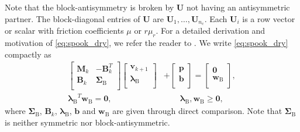 \documentclass[preprint,12pt]{elsarticle}
\let\vec\bm
\let\mat\mathbf
\numberwithin{equation}{section}
\def\jacb{\mat{B}}
\def\tB{\text{B}}
\def\tc{\text{c}}
\newcommand{\complementarityalign}[2]{{#1}^T{#2}=\vec{0}, &\qquad #1, #2 \geq \vec{0}}
\begin{document}
Note that the block-antisymmetry is broken by $\mat{U}$ not having an antisymmetric partner. The block-diagonal entries of $\mat{U}$ are $\mat{U}_1, \hdots, \mat{U}_{n_\tc}$. Each $\mat{U}_i$ is a row vector or scalar with friction coefficients $\mu$ or $r \mu_r$.
For a detailed derivation and motivation of \eqref{eq:spook_dry}, we refer the reader to \cite{lacoursiere2007ghosts}.
We write \eqref{eq:spook_dry} compactly as
\begin{equation}
    \label{eq:spook_dry_compact}
    \begin{aligned}
        \begin{bmatrix}
            \mat{M}_k & -\jacb_k^T     \\
            \jacb_k & \mat{\Sigma}_\tB \\
        \end{bmatrix}
        \begin{bmatrix}
            \vec{v}_{k+1}   \\
            \vec{\lambda}_\tB \\
        \end{bmatrix}
         & +
        \begin{bmatrix}
            \vec{p} \\
            \vec{b} \\
        \end{bmatrix}
        =
        \begin{bmatrix}
            \vec{0}   \\
            \vec{w}_\tB \\
        \end{bmatrix}, \\
        \complementarityalign{\vec{\lambda}_\tB}{\vec{w}_\tB},
    \end{aligned}
\end{equation}
where $\mat{\Sigma}_\tB$, $\mat{B}_k$, $\vec{\lambda}_\tB$,  $\vec{b}$ and $\vec{w}_\tB$ are given through direct comparison.
Note that $\mat{\Sigma}_\tB$ is neither symmetric nor block-antisymmetric.
\end{document}
